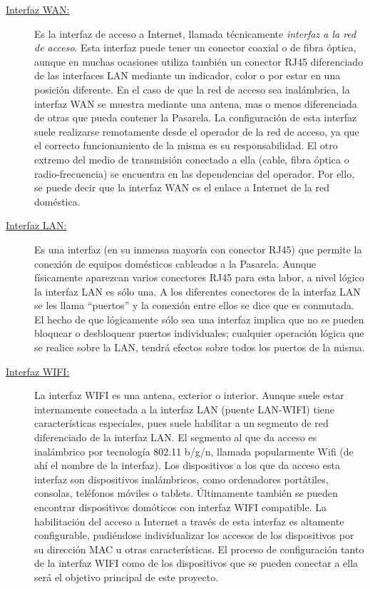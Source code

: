     \begin{description}
        \item[\underline{Interfaz WAN:}] Es la interfaz de acceso a Internet, llamada técnicamente \textit{interfaz a la red de acceso}. Esta interfaz puede tener un conector coaxial o de fibra óptica, aunque en muchas ocasiones utiliza también un conector RJ45 diferenciado de las interfaces LAN mediante un indicador, color o por estar en una posición diferente. En el caso de que la red de acceso sea inalámbrica, la interfaz WAN se muestra mediante una antena, mas o menos diferenciada de otras que pueda contener la Pasarela. La configuración de esta interfaz suele realizarse remotamente desde el operador de la red de acceso, ya que el correcto funcionamiento de la misma es su responsabilidad. El otro extremo del medio de transmisión conectado a ella (cable, fibra óptica o radio-frecuencia) se encuentra en las dependencias del operador. Por ello, se puede decir que la interfaz WAN es el enlace a Internet de la red doméstica.
        \item[\underline{Interfaz LAN:}] Es una interfaz (en su inmensa mayoría con conector RJ45) que permite la conexión de equipos domésticos cableados a la Pasarela. Aunque físicamente aparezcan varios conectores RJ45 para esta labor, a nivel lógico la interfaz LAN es sólo una. A los diferentes conectores de la interfaz LAN se les llama ``puertos'' y la conexión entre ellos se dice que es conmutada. El hecho de que lógicamente sólo sea una interfaz implica que no se pueden bloquear o desbloquear puertos individuales; cualquier operación lógica que se realice sobre la LAN, tendrá efectos sobre todos los puertos de la misma.
        \item[\underline{Interfaz WIFI:}] La interfaz WIFI es una antena, exterior o interior. Aunque suele estar internamente conectada a la interfaz LAN (puente LAN-WIFI) tiene características especiales, pues suele habilitar a un segmento de red diferenciado de la interfaz LAN. El segmento al que da acceso es inalámbrico por tecnología 802.11 b/g/n, llamada popularmente Wifi (de ahí el nombre de la interfaz). Los dispositivos a los que da acceso esta interfaz son dispositivos inalámbricos, como ordenadores portátiles, consolas, teléfonos móviles o tablets. Últimamente también se pueden encontrar dispositivos domóticos con interfaz WIFI compatible. La habilitación del acceso a Internet a través de esta interfaz es altamente configurable, pudiéndose individualizar los accesos de los dispositivos por su dirección MAC u otras características. El proceso de configuración tanto de la interfaz WIFI como de los dispositivos que se pueden conectar a ella será el objetivo principal de este proyecto.
    \end{description}

